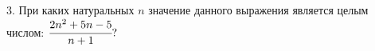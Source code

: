 3. При каких натуральных $n$ значение данного выражения является целым числом: $\cfrac{2n^2+5n-5}{n+1}?$\\
